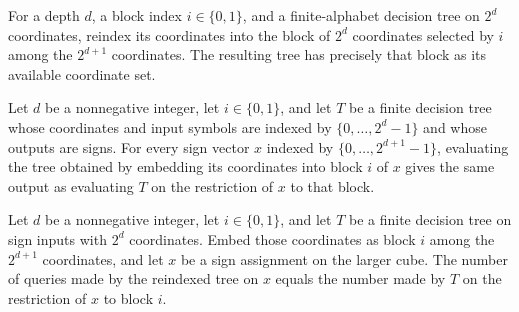 \begin{definition}
\label{FABL.recursiveNandTreeInBlock}
\leanok
{}
For a depth $d$, a block index $i\in\{0,1\}$, and a finite-alphabet decision tree on
$2^d$ coordinates, reindex its coordinates into the block of $2^d$ coordinates selected
by $i$ among the $2^{d+1}$ coordinates. The resulting tree has precisely that block as
its available coordinate set.
\end{definition}

\begin{theorem}
\label{FABL.eval_recursiveNandTreeInBlock}
\leanok
{}
Let $d$ be a nonnegative integer, let $i\in\{0,1\}$, and let $T$ be a finite decision
tree whose coordinates and input symbols are indexed by $\{0,\ldots,2^d-1\}$ and whose
outputs are signs. For every sign vector $x$ indexed by $\{0,\ldots,2^{d+1}-1\}$,
evaluating the tree obtained by embedding its coordinates into block $i$ of $x$ gives
the same output as evaluating $T$ on the restriction of $x$ to that block.
\end{theorem}

\begin{theorem}
\label{FABL.queryCount_recursiveNandTreeInBlock}
\leanok
{}
Let $d$ be a nonnegative integer, let $i\in\{0,1\}$, and let $T$ be a finite decision
tree on sign inputs with $2^d$ coordinates. Embed those coordinates as block $i$ among
the $2^{d+1}$ coordinates, and let $x$ be a sign assignment on the larger cube. The
number of queries made by the reindexed tree on $x$ equals the number made by $T$ on the
restriction of $x$ to block $i$.
\end{theorem}


